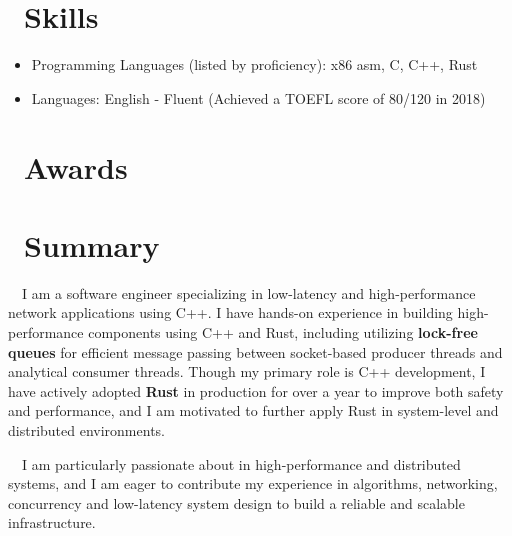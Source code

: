 \documentclass{resume}
\begin{document}

\section{\faCogs\ Skills}
\begin{itemize}[parsep=0.5ex]
  \item Programming Languages (listed by proficiency): x86 asm, C, C++, Rust
  \item Languages: English - Fluent (Achieved a TOEFL score of 80/120 in 2018)
\end{itemize}

\section{\faTrophy\ Awards}

\section{\faInfoCircle\ Summary}
~~I am a software engineer specializing in low-latency and high-performance network applications using C++. I have hands-on experience in building high-performance components using C++ and Rust, including utilizing \textbf{lock-free queues} for efficient message passing between socket-based producer threads and analytical consumer threads. Though my primary role is C++ development, I have actively adopted \textbf{Rust} in production for over a year to improve both safety and performance, and I am motivated to further apply Rust in system-level and distributed environments.

~~I am particularly passionate about in high-performance and distributed systems, and I am eager to contribute my experience in algorithms, networking, concurrency and low-latency system design to build a reliable and scalable infrastructure.
\end{document}
